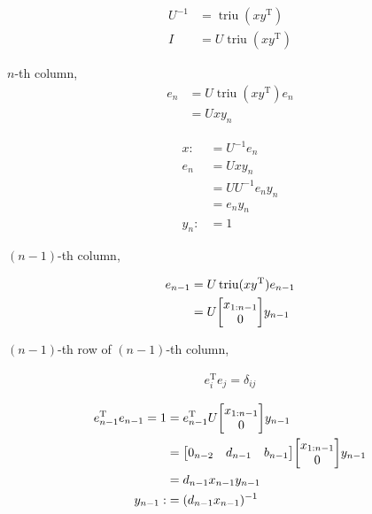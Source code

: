 \documentclass[11pt]{article}
\newcommand{\triu}{\mathop{\mathrm{triu}}}
\newcommand{\T}{\mathrm{T}}
\begin{document}
\begin{align*}
    U^{-1} &= \triu(xy^{\T}) \\
    I &= U \triu(xy^{\T})
\end{align*}

$n$-th column, 
\begin{align*}
    e_{n} &= U \triu(xy^{\T})e_{n} \\
    &= U x y_{n}    
\end{align*}




\begin{align*}
    x :&= U^{-1} e_{n} \\
    e_{n} &= U x y_{n} \\
        &= U U^{-1} e_{n} y_{n} \\
        &= e_{n} y_{n} \\
    y_n :&= 1
\end{align*}


$(n-1)$-th column, 

\begin{align*}
    e_{n-1} &= U \triu(xy^{\T})e_{n-1} \\
    &= U \mqty[
        x_{1:n-1} \\
        0
        ]y_{n-1}   
\end{align*}

$(n-1)$-th row of $(n-1)$-th column, 

\begin{align*}
    e_{i}^{\T} e_{j} = \delta_{ij} 
\end{align*}

\begin{align*}
    e_{n-1}^{\T} e_{n-1} = 1 &= e_{n-1}^{\T} U \mqty[
        x_{1:n-1} \\
        0
        ]y_{n-1} \\
        &= \mqty[
            0_{n-2} & d_{n-1} & b_{n-1}
        ] \mqty[
            x_{1:n-1} \\
            0
        ]y_{n-1} \\
        & = d_{n-1} x_{n-1} y_{n-1} \\
    y_{n-1} :&= (d_{n-1} x_{n-1})^{-1}
\end{align*}
\end{document}
